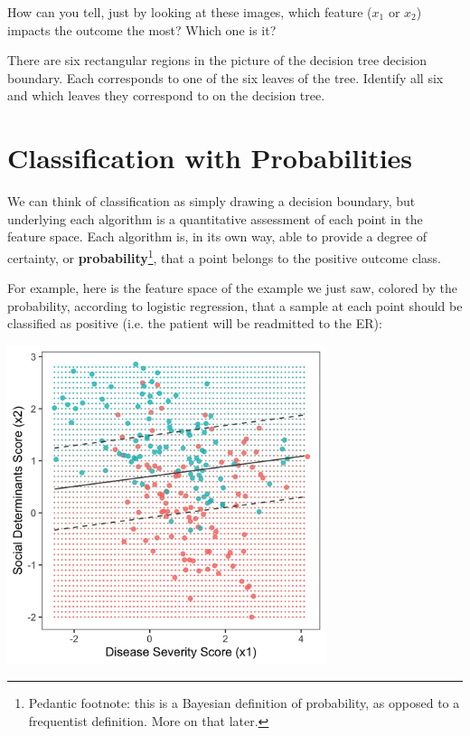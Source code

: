 \begin{question}{}
How can you tell, just by looking at these images, which feature ($x_1$ or $x_2$) impacts the outcome the most? Which one is it?
\end{question}

\begin{question}{}
There are six rectangular regions in the picture of the decision tree decision boundary. Each corresponds to one of the six leaves of the tree. Identify all six and which leaves they correspond to on the decision tree.
\end{question}


\section{Classification with Probabilities}

We can think of classification as simply drawing a decision boundary, but underlying each algorithm is a quantitative assessment of each point in the feature space. Each algorithm is, in its own way, able to provide a degree of certainty, or \textbf{probability}\footnote{Pedantic footnote: this is a Bayesian definition of probability, as opposed to a frequentist definition. More on that later.}, that a point belongs to the positive outcome class. 

For example, here is the feature space of the example we just saw, colored by the probability, according to logistic regression, that a sample at each point should be classified as positive (i.e. the patient will be readmitted to the ER): 
\begin{center}
\includegraphics[width=0.7\textwidth]{img/esl-logistic-prob.png}
\end{center}

